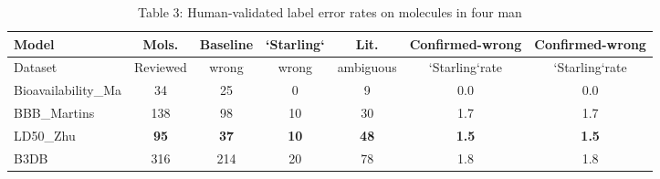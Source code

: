 \begin{table}[t]
\centering
\caption{Table 3: Human-validated label error rates on molecules in four man}
\label{tab:2605.07022}
\begin{tabular}{lcccccc}
\toprule
Model & Mols. & Baseline & `Starling` & Lit. & Confirmed-wrong & Confirmed-wrong \\
\midrule
Dataset & Reviewed & wrong & wrong & ambiguous & `Starling`rate & `Starling`rate \\
Bioavailability\_Ma & 34 & 25 & 0 & 9 & 0.0 & 0.0 \\
BBB\_Martins & 138 & 98 & 10 & 30 & 1.7 & 1.7 \\
LD50\_Zhu & \textbf{95} & \textbf{37} & \textbf{10} & \textbf{48} & \textbf{1.5} & \textbf{1.5} \\
B3DB & 316 & 214 & 20 & 78 & 1.8 & 1.8 \\
\bottomrule
\end{tabular}
\end{table}
